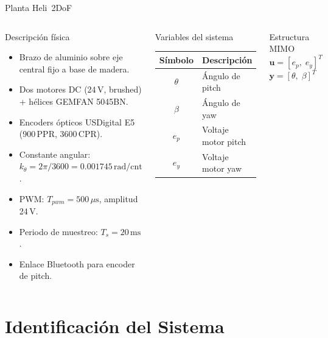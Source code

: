 \documentclass[mathserif,spanish,10pt]{beamer}
\begin{document}
\begin{frame}{Planta Heli~2DoF}
\begin{columns}[T]
  \begin{block}{Descripción física}
    \begin{itemize}
      \item Brazo de aluminio sobre eje central fijo a base de madera.
      \item Dos motores DC (24\,V, brushed) + hélices GEMFAN 5045BN.
      \item Encoders ópticos USDigital E5 (900\,PPR, 3600\,CPR).
      \item Constante angular: $k_\theta = 2\pi/3600 = 0.001745\,\text{rad/cnt}$.
      \item PWM: $T_{pwm}=500\,\mu\text{s}$, amplitud 24\,V.
      \item Periodo de muestreo: $T_s = 20\,\text{ms}$.
      \item Enlace Bluetooth para encoder de pitch.
    \end{itemize}
  \end{block}

  \begin{block}{Variables del sistema}
    \centering\small
    \begin{tabular}{cl}
      \hline
      \rowcolor{rowhdr}
      \color{white}\textbf{Símbolo} & \color{white}\textbf{Descripción} \\
      \hline
      $\theta$      & Ángulo de pitch \\[3pt]
      $\beta$       & Ángulo de yaw \\[3pt]
      $e_p$         & Voltaje motor pitch \\[3pt]
      $e_y$         & Voltaje motor yaw \\[3pt]
      \hline
    \end{tabular}
  \end{block}

  \begin{block}{Estructura MIMO}
    \centering\small
    $\mathbf{u} = [e_p,\; e_y]^T$\quad
    $\mathbf{y} = [\theta,\; \beta]^T$
  \end{block}
\end{columns}
\end{frame}

\section{Identificación del Sistema}
\end{document}
